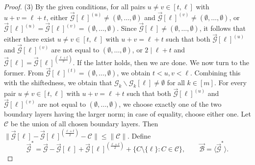 \documentclass[10pt,a4paper]{amsart}
\begin{document}
\begin{proof}
(3)   By the given conditions,  for all pairs $u\neq v\in [t,\ell]$ with  $u+v=\ell+t$, either $\vec{\mathcal{G}}[\ell]^{(u)}\neq (\emptyset,\ldots, \emptyset)$ and $\vec{\mathcal{G}}[\ell]^{(v)}\neq (\emptyset,\ldots, \emptyset)$, or $\vec{\mathcal{G}}[\ell]^{(u)}=\vec{\mathcal{G}}[\ell]^{(v)}=(\emptyset,\ldots, \emptyset)$.
Since $\vec{\mathcal{G}}[\ell]\neq (\emptyset,\ldots, \emptyset)$, it follows  that either there exist $u\neq v\in [t,\ell]$ with  $u+v=\ell+t$ such that both $\vec{\mathcal{G}}[\ell]^{(u)}$ and $\vec{\mathcal{G}}[\ell]^{(v)}$ are  not equal to  $(\emptyset,\ldots, \emptyset)$, or  $2\mid \ell+t$ and $\vec{\mathcal{G}}[\ell]= \vec{\mathcal{G}}[\ell]^{(\frac{\ell+t}{2})}$. 
If the latter holds, then we are done. We now turn to the former.
From $\vec{\mathcal{G}}[\ell]^{(t)}=(\emptyset,\ldots,\emptyset)$, we obtain $t<u, v<\ell$. 
Combining this with the shiftedness, we obtain that
$\mathcal{G}_k\backslash \mathcal{G}_k[\ell]\neq \emptyset$  for all $k\in[m]$.
For every pair
$u\neq v\in [t,\ell]$ with $u+v=\ell+t$ such that both
$\vec{\mathcal{G}}[\ell]^{(u)}$ and $\vec{\mathcal{G}}[\ell]^{(v)}$ are not equal to
$(\emptyset,\ldots,\emptyset)$,  we choose exactly one of the two boundary layers having
the larger norm; in case of equality, choose either one.
Let $\mathcal C$ be the union of all chosen boundary layers.
Then $\|\vec{\mathcal{G}}[\ell]-\vec{\mathcal{G}}[\ell]^{(\frac{\ell+t}{2})}- \mathcal C\|\leq \|\mathcal C\|$.
Define 
$$
\vec{\mathcal{G}}^*
=
\vec{\mathcal{G}}-\vec{\mathcal{G}}[\ell]+\vec{\mathcal{G}}[\ell]^{(\frac{\ell+t}{2})}+
\{C\setminus\{\ell\}:C\in\mathcal C\},\qquad \vec{\mathcal{B}}=\langle\vec{\mathcal{G}}^*\rangle.
$$


\end{proof}
\end{document}
